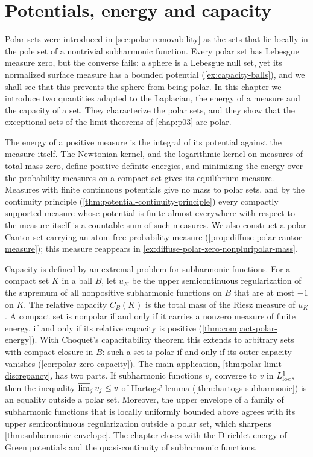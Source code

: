 \chapter{Potentials, energy and capacity}
\label{chap:p04}
Polar sets were introduced in \cref{sec:polar-removability} as the sets that lie locally in the pole set of a nontrivial subharmonic function. Every polar set has Lebesgue measure zero, but the converse fails: a sphere is a Lebesgue null set, yet its normalized surface measure has a bounded potential (\cref{ex:capacity-balls}), and we shall see that this prevents the sphere from being polar. In this chapter we introduce two quantities adapted to the Laplacian, the energy of a measure and the capacity of a set. They characterize the polar sets, and they show that the exceptional sets of the limit theorems of \cref{chap:p03} are polar.

The energy of a positive measure is the integral of its potential against the measure itself. The Newtonian kernel, and the logarithmic kernel on measures of total mass zero, define positive definite energies, and minimizing the energy over the probability measures on a compact set gives its equilibrium measure. Measures with finite continuous potentials give no mass to polar sets, and by the continuity principle (\cref{thm:potential-continuity-principle}) every compactly supported measure whose potential is finite almost everywhere with respect to the measure itself is a countable sum of such measures. We also construct a polar Cantor set carrying an atom-free probability measure (\cref{prop:diffuse-polar-cantor-measure}); this measure reappears in \cref{ex:diffuse-polar-zero-nonpluripolar-mass}.

Capacity is defined by an extremal problem for subharmonic functions. For a compact set $K$ in a ball $B$, let $u_K$ be the upper semicontinuous regularization of the supremum of all nonpositive subharmonic functions on $B$ that are at most $-1$ on $K$. The relative capacity $C_B(K)$ is the total mass of the Riesz measure of $u_K$. A compact set is nonpolar if and only if it carries a nonzero measure of finite energy, if and only if its relative capacity is positive (\cref{thm:compact-polar-energy}). With Choquet's capacitability theorem this extends to arbitrary sets with compact closure in $B$: such a set is polar if and only if its outer capacity vanishes (\cref{cor:polar-zero-capacity}). The main application, \cref{thm:polar-limit-discrepancy}, has two parts. If subharmonic functions $v_j$ converge to $v$ in $L^1_{\mathrm{loc}}$, then the inequality $\varlimsup_jv_j\leq v$ of Hartogs' lemma (\cref{thm:hartogs-subharmonic}) is an equality outside a polar set. Moreover, the upper envelope of a family of subharmonic functions that is locally uniformly bounded above agrees with its upper semicontinuous regularization outside a polar set, which sharpens \cref{thm:subharmonic-envelope}. The chapter closes with the Dirichlet energy of Green potentials and the quasi-continuity of subharmonic functions.

